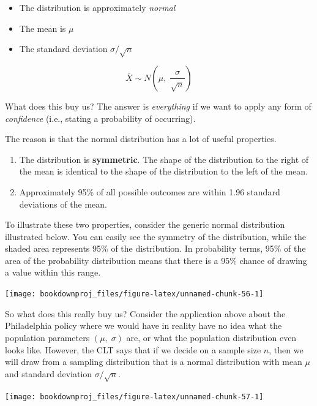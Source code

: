 \documentclass[
]{book}
\begin{document}
\begin{itemize}
\item
  The distribution is approximately \emph{normal}
\item
  The mean is \(\mu\)
\item
  The standard deviation \(\sigma/\sqrt{n}\)
\end{itemize}

\[\bar{X} \sim N \left( \mu, \; \frac{\sigma}{\sqrt{n}} \right)\]

What does this buy us? The answer is \emph{everything} if we want to apply any form of \emph{confidence} (i.e., stating a probability of occurring).

The reason is that the normal distribution has a lot of useful properties.

\begin{enumerate}
\def\labelenumi{\arabic{enumi}.}
\item
  The distribution is \textbf{symmetric}. The shape of the distribution to the right of the mean is identical to the shape of the distribution to the left of the mean.
\item
  Approximately 95\% of all possible outcomes are within 1.96 standard deviations of the mean.
\end{enumerate}

To illustrate these two properties, consider the generic normal distribution illustrated below. You can easily see the symmetry of the distribution, while the shaded area represents 95\% of the distribution. In probability terms, 95\% of the area of the probability distribution means that there is a 95\% chance of drawing a value within this range.

\begin{center}\texttt{[image: bookdownproj\_files/figure-latex/unnamed-chunk-56-1]} \end{center}

So what does this really buy us? Consider the application above about the Philadelphia policy where we would have in reality have no idea what the population parameters \((\mu,\;\sigma)\) are, or what the population distribution even looks like. However, the CLT says that if we decide on a sample size \(n\), then we will draw from a sampling distribution that is a normal distribution with mean \(\mu\) and standard deviation \(\sigma / \sqrt{n}\).

\begin{center}\texttt{[image: bookdownproj\_files/figure-latex/unnamed-chunk-57-1]} \end{center}
\end{document}
